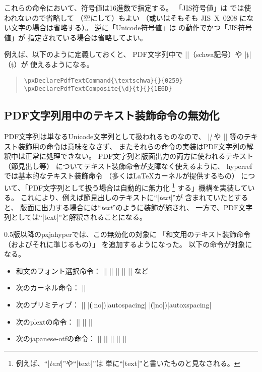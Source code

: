 \documentclass[uplatex,a4paper]{jsarticle}
\newcommand{\Pkg}[1]{\textsf{#1}}
\newcommand{\Means}{：\quad}
\begin{document}
これらの命令において、符号値は16進数で指定する。
「JIS符号値」は {\upLaTeX} では使われないので省略して
（空にして）もよい
（或いはそもそも JIS~X~0208 にない文字の場合は省略する）。
逆に「Unicode符号値」は {\pLaTeX} の動作でかつ「JIS符号値」が
指定されている場合は省略してよい。

例えば、以下のように定義しておくと、
PDF文字列中で |\textschwa|（schwa記号）や |\d{t}|（\d{t}）が
使えるようになる。
\begin{quote}\small\begin{verbatim}
\pxDeclarePdfTextCommand{\textschwa}{}{0259}
\pxDeclarePdfTextComposite{\d}{t}{}{1E6D}
\end{verbatim}\end{quote}

\subsection{PDF文字列用中のテキスト装飾命令の無効化}
\label{ssec:disablecmds}

PDF文字列は単なるUnicode文字列として扱われるものなので、
|\textit| や |\large| 等のテキスト装飾用の命令は意味をなさず、
またそれらの命令の実装はPDF文字列の解釈中は正常に処理できない。
PDF文字列と版面出力の両方に使われるテキスト（節見出し等）
についてテキスト装飾命令が支障なく使えるように、
\Pkg{hyperref}では基本的なテキスト装飾命令
（多くは{\LaTeX}カーネルが提供するもの）
について、「PDF文字列として扱う場合は自動的に無力化
\footnote{例えば、“|\textit{text}|”や“|{\large text}|”は
  単に“|text|”と書いたものと見なされる。}
する」機構を実装している。
これにより、例えば節見出しのテキストに“|\textit{text}|”が
含まれていたとすると、
版面に出力する場合には“\textit{text}”のように装飾が施され、
一方で、PDF文字列としては“|text|”と解釈されることになる。

0.5版以降の\Pkg{pxjahyper}では、この無効化の対象に
「和文用のテキスト装飾命令（およびそれに準じるもの）」
を追加するようになった。
以下の命令が対象になる。

\begin{itemize}
\item 和文のフォント選択命令\Means
  |\textmc| |\gtfamily| |\kanjifamily| |\useroman| |\userelfont|
  など
\item 次の{\pLaTeX}カーネル命令\Means
  |\<|
\item 次の{\pTeX}プリミティブ\Means
  |\inhibitglue| |\|(|no|)|autospacing| |\|(|no|)|autoxspacing|
\item 次の\Pkg{plext}の命令\Means
  |\bou| |\kasen| |\rensuji|
\item 次の\Pkg{japanese-otf}の命令\Means
  |\textmg| |\mgfamily| |\ltseries| |\ebseries| |\propshape|
\end{itemize}
\end{document}
